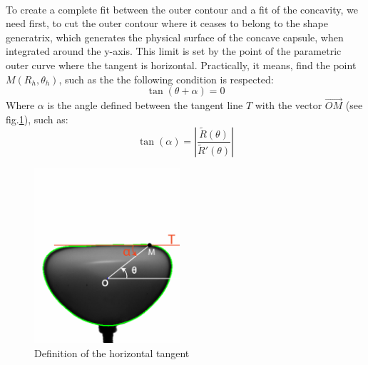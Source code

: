 \paragraph{}
To create a complete fit between the outer contour and a fit of the concavity, we need first, to cut the outer contour where it ceases to belong to the shape generatrix, which generates the physical surface of the concave capsule, when integrated around the y-axis. This limit is set by the point of the parametric outer curve where the tangent is horizontal.
Practically, it means, find the point $M(R_{h},\theta_h)$, such as the the following condition is respected:
\begin{equation}
	\tan(\theta+\alpha) =0
	\label{eq:tangent_horizontal}
\end{equation}
Where $\alpha$ is the angle defined between the tangent line $T$ with the vector $\vec{OM}$ (see fig.\ref{fig:Illustration_tangent}), such as:
\begin{equation}
	\tan(\alpha) =|{\frac {\tilde{R}(\theta )}{\tilde{R}'(\theta )}}|
	\label{eq:tangent}
\end{equation}
\begin{figure}[H] %
	\centering%
  \includegraphics[width=0.48\textwidth]{figures/Chapter_1/tan_alpha.png}
	\caption{Definition of the horizontal tangent}
	\label{fig:Illustration_tangent}
\end{figure}
